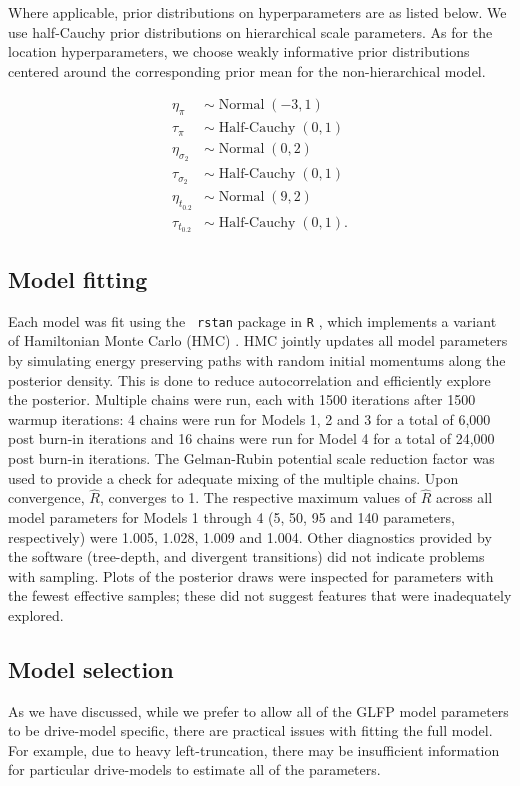 \documentclass[12pt]{article}
\newcommand{\op}{\operatorname}
\begin{document}
Where applicable, prior distributions on hyperparameters are as listed below. We use half-Cauchy prior distributions on hierarchical scale parameters. As for the location hyperparameters, we choose weakly informative prior distributions centered around the corresponding prior mean for the non-hierarchical model.


\begin{align*}
  \eta_{\pi} & \sim \op{Normal}(-3, 1)\\
  \tau_{\pi} & \sim \op{Half-Cauchy}(0, 1)\\
  \eta_{\sigma_2} & \sim \op{Normal}(0, 2)\\
  \tau_{\sigma_2} & \sim \op{Half-Cauchy}(0, 1)\\
  \eta_{t_{0.2}} & \sim \op{Normal}(9, 2)\\
  \tau_{t_{0.2}} & \sim \op{Half-Cauchy}(0, 1).
 \end{align*} 

\subsection{Model fitting}
\label{sec:Model fitting}
Each model was fit using the {\tt
  rstan} \citep{rstan} package in {\tt R} \citep{r}, which implements a variant of Hamiltonian Monte Carlo (HMC)
\citep{betancourt}. HMC jointly updates all model parameters by simulating energy preserving paths with random initial momentums along the posterior density. This is done to reduce autocorrelation and efficiently explore the posterior. Multiple chains were run, each with 1500 iterations after 1500 warmup iterations: 4 chains were run for Models 1, 2 and 3 for a total of 6,000 post burn-in iterations and 16 chains were run for Model 4 for a total of 24,000 post burn-in iterations. The Gelman-Rubin potential scale reduction factor was used to provide a check for adequate mixing of the multiple chains. Upon convergence, $\hat{R}$, converges to 1.  The  respective maximum values of $\hat{R}$ across all model parameters for Models 1 through 4 (5, 50, 95 and 140 parameters, respectively) were 1.005, 1.028, 1.009 and 1.004. Other diagnostics provided by the software (tree-depth, and divergent transitions) did not indicate problems with sampling. Plots of the posterior draws were inspected for parameters with the fewest effective samples; these did not suggest features that were inadequately explored.



\subsection{Model selection}
\label{sec:Model Comparisons}
As we have discussed, while we prefer to allow all of the GLFP model parameters to be drive-model specific, there are practical issues with fitting the full model. For example, due to heavy left-truncation, there may be insufficient information for particular drive-models to estimate all of the parameters. 
\end{document}
